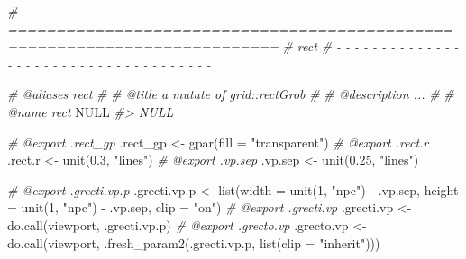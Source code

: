 \documentclass[
]{article}
\newenvironment{Shaded}{\begin{snugshade}}{\end{snugshade}}
\newcommand{\AttributeTok}[1]{\textcolor[rgb]{0.77,0.63,0.00}{#1}}
\newcommand{\CommentTok}[1]{\textcolor[rgb]{0.56,0.35,0.01}{\textit{#1}}}
\newcommand{\ConstantTok}[1]{\textcolor[rgb]{0.00,0.00,0.00}{#1}}
\newcommand{\DecValTok}[1]{\textcolor[rgb]{0.00,0.00,0.81}{#1}}
\newcommand{\FloatTok}[1]{\textcolor[rgb]{0.00,0.00,0.81}{#1}}
\newcommand{\FunctionTok}[1]{\textcolor[rgb]{0.00,0.00,0.00}{#1}}
\newcommand{\NormalTok}[1]{#1}
\newcommand{\OtherTok}[1]{\textcolor[rgb]{0.56,0.35,0.01}{#1}}
\newcommand{\SpecialCharTok}[1]{\textcolor[rgb]{0.00,0.00,0.00}{#1}}
\newcommand{\StringTok}[1]{\textcolor[rgb]{0.31,0.60,0.02}{#1}}
\begin{document}
\begin{Shaded}
\begin{Highlighting}[]
\CommentTok{\# ==========================================================================}
\CommentTok{\# rect}
\CommentTok{\# {-} {-} {-} {-} {-} {-} {-} {-} {-} {-} {-} {-} {-} {-} {-} {-} {-} {-} {-} {-} {-} {-} {-} {-} {-} {-} {-} {-} {-} {-} {-} {-} {-} {-} {-} {-} {-}}

\CommentTok{\#\textquotesingle{} @aliases rect}
\CommentTok{\#\textquotesingle{}}
\CommentTok{\#\textquotesingle{} @title a mutate of grid::rectGrob}
\CommentTok{\#\textquotesingle{}}
\CommentTok{\#\textquotesingle{} @description ...}
\CommentTok{\#\textquotesingle{}}
\CommentTok{\#\textquotesingle{} @name rect}
\ConstantTok{NULL}
\CommentTok{\#\textgreater{} NULL}

\CommentTok{\#\textquotesingle{} @export .rect\_gp}
\NormalTok{.rect\_gp }\OtherTok{\textless{}{-}} \FunctionTok{gpar}\NormalTok{(}\AttributeTok{fill =} \StringTok{"transparent"}\NormalTok{)}
\CommentTok{\#\textquotesingle{} @export .rect.r}
\NormalTok{.rect.r }\OtherTok{\textless{}{-}} \FunctionTok{unit}\NormalTok{(}\FloatTok{0.3}\NormalTok{, }\StringTok{"lines"}\NormalTok{)}
\CommentTok{\#\textquotesingle{} @export .vp.sep}
\NormalTok{.vp.sep }\OtherTok{\textless{}{-}} \FunctionTok{unit}\NormalTok{(}\FloatTok{0.25}\NormalTok{, }\StringTok{"lines"}\NormalTok{)}

\CommentTok{\#\textquotesingle{} @export .grecti.vp.p}
\NormalTok{.grecti.vp.p }\OtherTok{\textless{}{-}} \FunctionTok{list}\NormalTok{(}\AttributeTok{width =} \FunctionTok{unit}\NormalTok{(}\DecValTok{1}\NormalTok{, }\StringTok{"npc"}\NormalTok{) }\SpecialCharTok{{-}}\NormalTok{ .vp.sep,}
  \AttributeTok{height =} \FunctionTok{unit}\NormalTok{(}\DecValTok{1}\NormalTok{, }\StringTok{"npc"}\NormalTok{) }\SpecialCharTok{{-}}\NormalTok{ .vp.sep,}
  \AttributeTok{clip =} \StringTok{"on"}\NormalTok{)}
\CommentTok{\#\textquotesingle{} @export .grecti.vp}
\NormalTok{.grecti.vp }\OtherTok{\textless{}{-}} \FunctionTok{do.call}\NormalTok{(viewport, .grecti.vp.p)}
\CommentTok{\#\textquotesingle{} @export .grecto.vp}
\NormalTok{.grecto.vp }\OtherTok{\textless{}{-}} \FunctionTok{do.call}\NormalTok{(viewport, }\FunctionTok{.fresh\_param2}\NormalTok{(.grecti.vp.p, }\FunctionTok{list}\NormalTok{(}\AttributeTok{clip =} \StringTok{"inherit"}\NormalTok{)))}


\end{Highlighting}
\end{Shaded}
\end{document}
